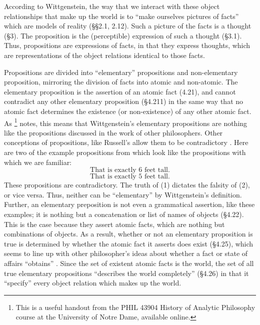 \documentclass[man,12pt,natbib]{apa6}
\begin{document}
According to Wittgenstein, the way that we interact with these object
relationships that make up the world is to ``make ourselves pictures of facts''
which are models of reality (\S\S 2.1, 2.12). Such a picture of the facts is a
thought (\S 3). The proposition is the (perceptible) expression of such a
thought (\S 3.1). Thus, propositions are expressions of facts, in that they
express thoughts, which are representations of the object relations identical
to those facts.

Propositions are divided into ``elementary'' propositions and non-elementary
proposition, mirroring the division of facts into atomic and non-atomic. The
elementary proposition is the assertion of an atomic fact (4.21), and cannot
contradict any other elementary proposition (\S 4.211) in the same way that no
atomic fact determines the existence (or non-existence) of any other atomic
fact. As \citet{Speaks07}\footnote{This is a useful handout from the PHIL 43904
History of Analytic Philosophy course at the University of Notre Dame,
available online.} notes, this means that Wittgenstein's elementary
propositions are nothing like the propositions discussed in the work of other
philosophers. Other conceptions of propositions, like Russell's allow them to
be contradictory \cite{Klement15}. Here are two of the example propositions
from \citet{Speaks07} which look like the propositions with which we are
familiar:    
\begin{equation}
\text{That is exactly 6 feet tall.}
\end{equation}
\begin{equation}
\text{That is exactly 5 feet tall.}
\end{equation}
These propositions are contradictory. The truth of (1) dictates the falsity of
(2), or vice versa. Thus, neither can be ``elementary'' by Wittgenstein's
definition. Further, an elementary preposition is not even a grammatical
assertion, like these examples; it is nothing but a concatenation or list of
names of objects (\S 4.22). This is the case because they assert atomic facts,
which are nothing but combinations of objects. As a result, whether or not an
elementary proposition is true is determined by whether the atomic fact it
asserts does exist (\S 4.25), which seems to line up with other philosopher's
ideas about whether a fact or state of affairs ``obtains'' \cite{Mulligan13}.
Since the set of existent atomic facts is the world, the set of all true
elementary propositions “describes the world completely” (\S 4.26) in that it
``specify'' every object relation which makes up the world.
\end{document}

